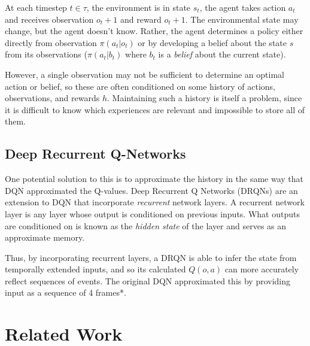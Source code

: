 \documentclass[letterpaper]{article}
\begin{document}
 	At each timestep $t\in \tau$, the environment is in state $s_t$, the agent takes action $a_t$ and receives observation $o_t+1$ and reward $o_t+1$. The environmental state may change, but the agent doesn't know. Rather, the agent determines a policy either directly from observation $\pi(a_t|o_t)$ or by developing a belief about the state $s$ from its observations ($\pi(a_t|b_t)$ where $b_t$ is a \textit{belief} about the current state). 
 	
 	However, a single observation may not be sufficient to determine an optimal action or belief, so these are often conditioned on some history of actions, observations, and rewards $h$. Maintaining such a history is itself a problem, since it is difficult to know which experiences are relevant and impossible to store all of them.
 	
 	\subsection{Deep Recurrent Q-Networks}
 	
 	One potential solution to this is to approximate the history in the same way that DQN approximated the Q-values. Deep Recurrent Q Networks (DRQNs) are an extension to DQN that incorporate \textit{recurrent} network layers. A recurrent network layer is any layer whose output is conditioned on previous inputs. What outputs are conditioned on is known as the \textit{hidden state} of the layer and serves as an approximate memory.
 	
 	Thus, by incorporating recurrent layers, a DRQN is able to infer the state from temporally extended inputs, and so its calculated $Q(o,a)$ can more accurately reflect sequences of events. The original DQN approximated this by providing input as a sequence of 4 frames*.
 	
	 
	
	\section{Related Work}
	
\end{document}
